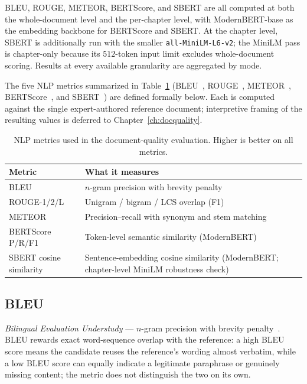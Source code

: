 BLEU, ROUGE, METEOR, BERTScore, and SBERT are all computed at both the whole-document level and the per-chapter level, with ModernBERT-base as the embedding backbone for BERTScore and SBERT. At the chapter level, SBERT is additionally run with the smaller \texttt{all-MiniLM-L6-v2}; the MiniLM pass is chapter-only because its $512$-token input limit excludes whole-document scoring. Results at every available granularity are aggregated by mode.

The five NLP metrics summarized in Table~\ref{tab:nlp-metrics-overview} (BLEU~\cite{Papineni2002}, ROUGE~\cite{Lin2004}, METEOR~\cite{Banerjee2005}, BERTScore~\cite{Zhang2020}, and SBERT~\cite{Reimers2019}) are defined formally below. Each is computed against the single expert-authored reference document; interpretive framing of the resulting values is deferred to Chapter~\ref{ch:docquality}.

\begin{table}[htbp]
    \centering
    \caption{NLP metrics used in the document-quality evaluation. Higher is better on all metrics.}
    \label{tab:nlp-metrics-overview}
    \begin{tabularx}{\linewidth}{@{}l X@{}}
        \toprule
        Metric & What it measures \\
        \midrule
        BLEU                      & $n$-gram precision with brevity penalty \\
        ROUGE-1/2/L               & Unigram / bigram / LCS overlap (F1) \\
        METEOR                    & Precision--recall with synonym and stem matching \\
        BERTScore P/R/F1          & Token-level semantic similarity (ModernBERT) \\
        SBERT cosine similarity   & Sentence-embedding cosine similarity (ModernBERT; chapter-level MiniLM robustness check) \\
        \bottomrule
    \end{tabularx}
\end{table}

\subsection{BLEU}

\emph{Bilingual Evaluation Understudy} --- $n$-gram precision with brevity penalty~\cite{Papineni2002}. BLEU rewards exact word-sequence overlap with the reference: a high BLEU score means the candidate reuses the reference's wording almost verbatim, while a low BLEU score can equally indicate a legitimate paraphrase or genuinely missing content; the metric does not distinguish the two on its own.

